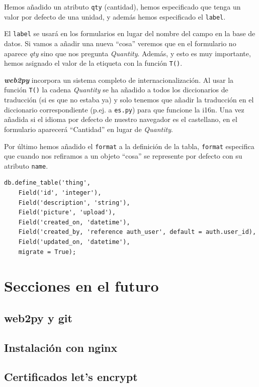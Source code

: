 \documentclass[
  12pt,
  spanish,
]{article}
\begin{document}
Hemos añadido un atributo \texttt{qty} (cantidad), hemos especificado
que tenga un valor por defecto de una unidad, y además hemos
especificado el \texttt{label}.

El \texttt{label} se usará en los formularios en lugar del nombre del
campo en la base de datos. Si vamos a añadir una nueva ``cosa'' veremos
que en el formulario no aparece \emph{qty} sino que nos pregunta
\emph{Quantity}. Además, y esto es muy importante, hemos asignado el
valor de la etiqueta con la función \texttt{T()}.

\textbf{\emph{web2py}} incorpora un sistema completo de
internacionalización. Al usar la función \texttt{T()} la cadena
\emph{Quantity} se ha añadido a todos los diccionarios de traducción (si
es que no estaba ya) y solo tenemos que añadir la traducción en el
diccionario correspondiente (p.ej. a \texttt{es.py}) para que funcione
la i16n. Una vez añadida si el idioma por defecto de nuestro navegador
es el castellano, en el formulario aparecerá ``Cantidad'' en lugar de
\emph{Quantity}.

Por último hemos añadido el \texttt{format} a la definición de la tabla,
\texttt{format} especifica que cuando nos refiramos a un objeto ``cosa''
se represente por defecto con su atributo \texttt{name}.

\begin{verbatim}
db.define_table('thing',
    Field('id', 'integer'),
    Field('description', 'string'),
    Field('picture', 'upload'),
    Field('created_on, 'datetime'),
    Field('created_by, 'reference auth_user', default = auth.user_id),
    Field('updated_on, 'datetime'),
    migrate = True);
\end{verbatim}

\hypertarget{secciones-en-el-futuro}{%
\section{Secciones en el futuro}\label{secciones-en-el-futuro}}

\hypertarget{web2py-y-git}{%
\subsection{web2py y git}\label{web2py-y-git}}

\hypertarget{instalaciuxf3n-con-nginx}{%
\subsection{Instalación con nginx}\label{instalaciuxf3n-con-nginx}}

\hypertarget{certificados-lets-encrypt}{%
\subsection{Certificados let's
encrypt}\label{certificados-lets-encrypt}}
\end{document}

